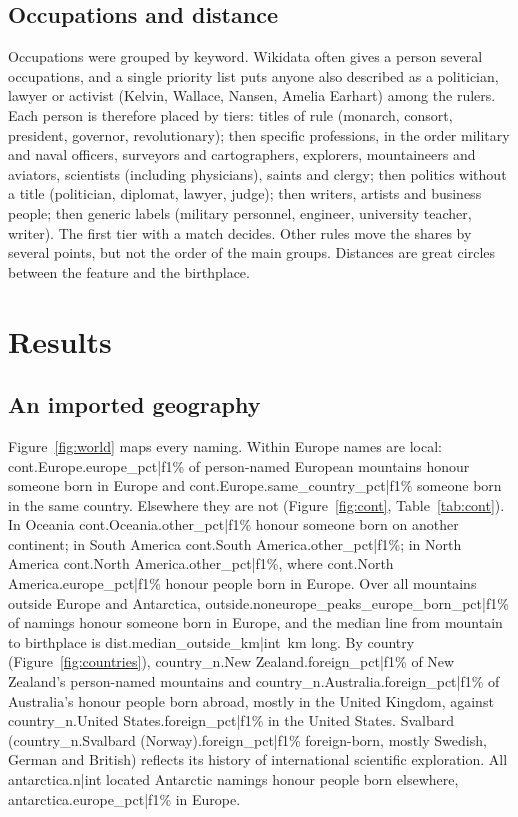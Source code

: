 \documentclass[11pt,a4paper]{article}
\begin{document}
\subsection{Occupations and distance}
Occupations were grouped by keyword. Wikidata often gives a person several occupations, and a single priority list puts anyone also described as a politician, lawyer or activist (Kelvin, Wallace, Nansen, Amelia Earhart) among the rulers. Each person is therefore placed by tiers: titles of rule (monarch, consort, president, governor, revolutionary); then specific professions, in the order military and naval officers, surveyors and cartographers, explorers, mountaineers and aviators, scientists (including physicians), saints and clergy; then politics without a title (politician, diplomat, lawyer, judge); then writers, artists and business people; then generic labels (military personnel, engineer, university teacher, writer). The first tier with a match decides. Other rules move the shares by several points, but not the order of the main groups. Distances are great circles between the feature and the birthplace.

\section{Results}
\subsection{An imported geography}
Figure~\ref{fig:world} maps every naming. Within Europe names are local: {{cont.Europe.europe_pct|f1}}\% of person-named European mountains honour someone born in Europe and {{cont.Europe.same_country_pct|f1}}\% someone born in the same country. Elsewhere they are not (Figure~\ref{fig:cont}, Table~\ref{tab:cont}). In Oceania {{cont.Oceania.other_pct|f1}}\% honour someone born on another continent; in South America {{cont.South America.other_pct|f1}}\%; in North America {{cont.North America.other_pct|f1}}\%, where {{cont.North America.europe_pct|f1}}\% honour people born in Europe. Over all mountains outside Europe and Antarctica, {{outside.noneurope_peaks_europe_born_pct|f1}}\% of namings honour someone born in Europe, and the median line from mountain to birthplace is {{dist.median_outside_km|int}}~km long. By country (Figure~\ref{fig:countries}), {{country_n.New Zealand.foreign_pct|f1}}\% of New Zealand's person-named mountains and {{country_n.Australia.foreign_pct|f1}}\% of Australia's honour people born abroad, mostly in the United Kingdom, against {{country_n.United States.foreign_pct|f1}}\% in the United States. Svalbard ({{country_n.Svalbard (Norway).foreign_pct|f1}}\% foreign-born, mostly Swedish, German and British) reflects its history of international scientific exploration. All {{antarctica.n|int}} located Antarctic namings honour people born elsewhere, {{antarctica.europe_pct|f1}}\% in Europe.
\end{document}
